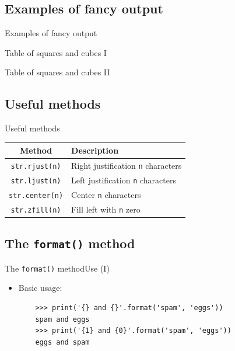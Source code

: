 \documentclass[10pt,compress]{beamer} %
\begin{document}
\subsection{Examples of fancy output}
\begin{frame}{Examples of fancy output}{}
	\begin{block}{Table of squares and cubes I}
	\vspace{-0.2cm}
	
	\vspace{-0.2cm}
	\end{block}

	\begin{block}{Table of squares and cubes II}
	\vspace{-0.2cm}
	
	\vspace{-0.2cm}
	\end{block}
\end{frame}

\subsection{Useful methods}
\begin{frame}{Useful methods}{}

	\begin{tabular}{c|l}\hline
  	\sc Method & \sc Description  \\\hline
  	\texttt{str.rjust(n)} & Right justification \texttt{n} characters \\
  	\texttt{str.ljust(n)} & Left justification \texttt{n} characters \\
  	\texttt{str.center(n)} & Center \texttt{n} characters \\
  	\texttt{str.zfill(n)} & Fill left with \texttt{n} zero \\\hline
  	\end{tabular}

\end{frame}

\subsection{The \texttt{format()} method}
\begin{frame}[fragile]{The \texttt{format()} method}{Use (I)}
\begin{itemize}	
\item Basic usage:
	\begin{verbatim}
	>>> print('{} and {}'.format('spam', 'eggs'))
	spam and eggs
	>>> print('{1} and {0}'.format('spam', 'eggs'))
	eggs and spam
	\end{verbatim}
\end{itemize}
\end{frame}
\end{document}
